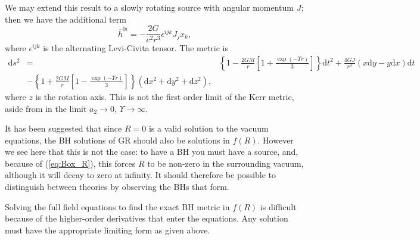 \documentclass[aps,prd,reprint,showpacs]{revtex4-1}
\newcommand{\eqnref}[1]{(\ref{eq:#1})}
\newcommand{\dd}{\ensuremath{\text{d}}}
\begin{document}
We may extend this result to a slowly rotating source with angular momentum $J$; then we have the additional term\cite{Hobson2006}
\begin{equation}
\overline{h}^{0i} = -\frac{2G}{c^2r^3} \epsilon^{ijk}J_j x_k,
\end{equation}
where $\epsilon^{ijk}$ is the alternating Levi-Civita tensor. The metric is
\begin{eqnarray}
\dd s^2 & = & \left\{1-\frac{2GM}{r}\left[1 + \frac{\exp(- \Upsilon r)}{3}\right]\right\}\dd t^2 + \frac{4GJ}{r^3}\left(x\dd y - y\dd x\right)\dd t \nonumber \\ & - {} \left\{1 +\frac{2GM}{r}\left[1 - \frac{\exp(- \Upsilon r)}{3}\right]\right\}\left(\dd x^2 + \dd y^2 + \dd z^2\right),
\end{eqnarray}
where $z$ is the rotation axis. This is not the first order limit of the Kerr metric, aside from in the limit $a_2 \rightarrow 0$, $\Upsilon \rightarrow \infty$.

It has been suggested that since $R = 0$ is a valid solution to the vacuum equations, the BH solutions of GR should also be solutions in $f(R)$\cite{Psaltis2008, Barausse2008}. However we see here that this is not the case: to have a BH you must have a source, and, because of \eqnref{Box_R}, this forces $R$ to be non-zero in the surrounding vacuum, although it will decay to zero at infinity\cite{Olmo2007c}. It should therefore be possible to distinguish between theories by observing the BHs that form.

Solving the full field equations to find the exact BH metric in $f(R)$ is difficult because of the higher-order derivatives that enter the equations. Any solution must have the appropriate limiting form as given above.
\end{document}
